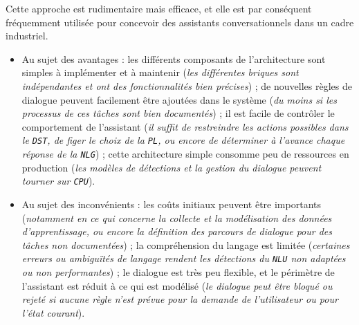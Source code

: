 			
			Cette approche est rudimentaire mais efficace, et elle est par conséquent fréquemment utilisée pour concevoir des assistants conversationnels dans un cadre industriel.
			\begin{itemize}
				\item[\textcolor{colorDarkPastelGreen}{\textcolor{colorDarkPastelGreen}{\faThumbsUp}}] Au sujet des avantages :
					les différents composants de l'architecture sont simples à implémenter et à maintenir
					(\textit{les différentes briques sont indépendantes et ont des fonctionnalités bien précises}) ;
					de nouvelles règles de dialogue peuvent facilement être ajoutées dans le système
					(\textit{du moins si les processus de ces tâches sont bien documentés}) ;
					il est facile de contrôler le comportement de l'assistant
					(\textit{il suffit de restreindre les actions possibles dans le \texttt{DST}, de figer le choix de la \texttt{PL}, ou encore de déterminer à l'avance chaque réponse de la \texttt{NLG}}) ;
					cette architecture simple consomme peu de ressources en production (\textit{les modèles de détections et la gestion du dialogue peuvent tourner sur \texttt{CPU}}).
				\item[\textcolor{colorDarkPastelRed}{\textcolor{colorDarkPastelRed}{\faThumbsDown}}] Au sujet des inconvénients :
					les coûts initiaux peuvent être importants (\textit{notamment en ce qui concerne la collecte et la modélisation des données d'apprentissage, ou encore la définition des parcours de dialogue pour des tâches non documentées}) ;
					la compréhension du langage est limitée (\textit{certaines erreurs ou ambiguïtés de langage rendent les détections du \texttt{NLU} non adaptées ou non performantes}) ;
					le dialogue est très peu flexible, et le périmètre de l'assistant est réduit à ce qui est modélisé (\textit{le dialogue peut être bloqué ou rejeté si aucune règle n'est prévue pour la demande de l'utilisateur ou pour l'état courant}).
			\end{itemize}
			
			\newpage
			
